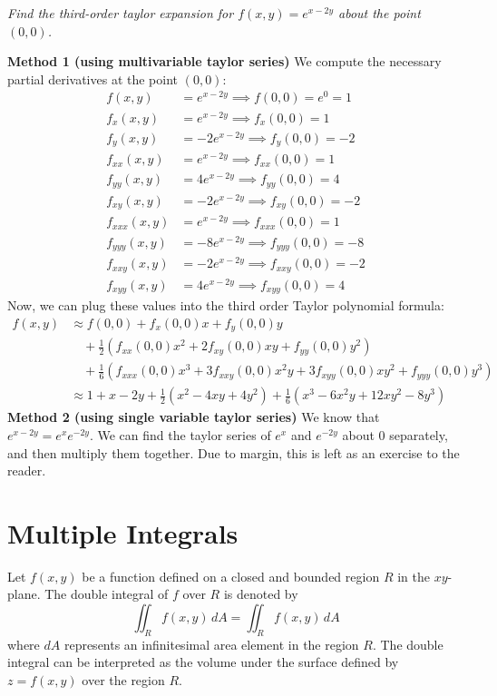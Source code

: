 \documentclass[11pt]{report}
\begin{document}
\begin{example}
    \textit{Find the third-order taylor expansion for $f(x,y) = e^{x-2y}$ about the point $(0,0)$.}
    
    \textbf{Method 1 (using multivariable taylor series)} We compute the necessary partial derivatives at the point $(0,0)$:
    \begin{align*}
        f(x,y) &= e^{x-2y} \implies f(0,0) = e^0 = 1 \\
        f_x(x,y) &= e^{x-2y} \implies f_x(0,0) = 1 \\
        f_y(x,y) &= -2e^{x-2y} \implies f_y(0,0) = -2 \\
        f_{xx}(x,y) &= e^{x-2y} \implies f_{xx}(0,0) = 1 \\
        f_{yy}(x,y) &= 4e^{x-2y} \implies f_{yy}(0,0) = 4 \\
        f_{xy}(x,y) &= -2e^{x-2y} \implies f_{xy}(0,0) = -2 \\
        f_{xxx}(x,y) &= e^{x-2y} \implies f_{xxx}(0,0) = 1 \\
        f_{yyy}(x,y) &= -8e^{x-2y} \implies f_{yyy}(0,0) = -8 \\
        f_{xxy}(x,y) &= -2e^{x-2y} \implies f_{xxy}(0,0) = -2 \\
        f_{xyy}(x,y) &= 4e^{x-2y} \implies f_{xyy}(0,0) = 4
    \end{align*}
    Now, we can plug these values into the third order Taylor polynomial formula:
    \begin{align*}
        f(x,y) &\approx f(0,0) + f_x(0,0)x + f_y(0,0)y \\
        &\quad + \frac{1}{2} \left( f_{xx}(0,0)x^2 + 2f_{xy}(0,0)xy + f_{yy}(0,0)y^2 \right) \\
        &\quad + \frac{1}{6} \left( f_{xxx}(0,0)x^3 + 3f_{xxy}(0,0)x^2y + 3f_{xyy}(0,0)xy^2 + f_{yyy}(0,0)y^3 \right) \\
        &\approx 1 + x - 2y + \frac{1}{2} \left( x^2 - 4xy + 4y^2 \right) + \frac{1}{6} \left( x^3 - 6x^2y + 12xy^2 - 8y^3 \right)
    \end{align*}
    \textbf{Method 2 (using single variable taylor series)} We know that $e^{x - 2y} = e^{x} e^{-2y}$. We can find the taylor series of $e^x$ and $e^{-2y}$ about $0$ separately, and then multiply them together. Due to margin, this is left as an exercise to the reader.
\end{example}
\section{Multiple Integrals}
\begin{definition}
    Let $f(x,y)$ be a function defined on a closed and bounded region $R$ in the $xy$-plane. The double integral of $f$ over $R$ is denoted by
    \begin{equation}
        \iint_R f(x,y) \, dA = \iint_R f(x,y) \, dA
    \end{equation}
    where $dA$ represents an infinitesimal area element in the region $R$. The double integral can be interpreted as the volume under the surface defined by $z = f(x,y)$ over the region $R$.
\end{definition}
\end{document}
